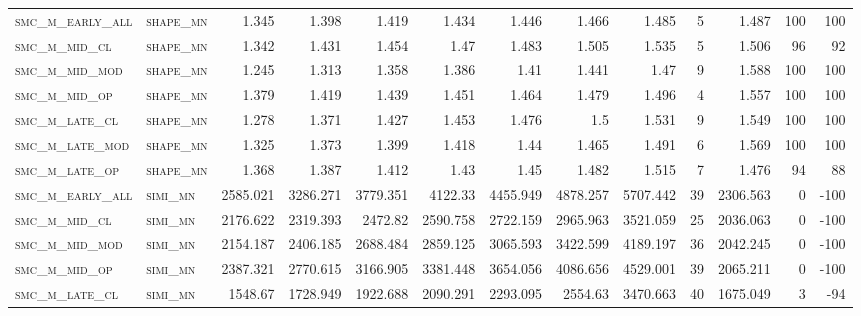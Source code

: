 \begin{landscape}
\begin{center}
\begin{footnotesize}
\begin{longtable}{llrrrrrrrr|rrr}
\textsc{smc\_m\_early\_all} & \textsc{shape\_mn }   & 1.345    & 1.398    & 1.419    & 1.434    & 1.446    & 1.466    & 1.485    & 5      & 1.487         & 100           & 100             \\
\textsc{smc\_m\_mid\_cl   } & \textsc{shape\_mn }   & 1.342    & 1.431    & 1.454    & 1.47     & 1.483    & 1.505    & 1.535    & 5      & 1.506         & 96            & 92              \\
\textsc{smc\_m\_mid\_mod  } & \textsc{shape\_mn }   & 1.245    & 1.313    & 1.358    & 1.386    & 1.41     & 1.441    & 1.47     & 9      & 1.588         & 100           & 100             \\
\textsc{smc\_m\_mid\_op   } & \textsc{shape\_mn }   & 1.379    & 1.419    & 1.439    & 1.451    & 1.464    & 1.479    & 1.496    & 4      & 1.557         & 100           & 100             \\
\textsc{smc\_m\_late\_cl  } & \textsc{shape\_mn }   & 1.278    & 1.371    & 1.427    & 1.453    & 1.476    & 1.5      & 1.531    & 9      & 1.549         & 100           & 100             \\
\textsc{smc\_m\_late\_mod } & \textsc{shape\_mn }   & 1.325    & 1.373    & 1.399    & 1.418    & 1.44     & 1.465    & 1.491    & 6      & 1.569         & 100           & 100             \\
\textsc{smc\_m\_late\_op  } & \textsc{shape\_mn }   & 1.368    & 1.387    & 1.412    & 1.43     & 1.45     & 1.482    & 1.515    & 7      & 1.476         & 94            & 88              \\
\textsc{smc\_m\_early\_all} & \textsc{simi\_mn  }   & 2585.021 & 3286.271 & 3779.351 & 4122.33  & 4455.949 & 4878.257 & 5707.442 & 39     & 2306.563      & 0             & -100            \\
\textsc{smc\_m\_mid\_cl   } & \textsc{simi\_mn  }   & 2176.622 & 2319.393 & 2472.82  & 2590.758 & 2722.159 & 2965.963 & 3521.059 & 25     & 2036.063      & 0             & -100            \\
\textsc{smc\_m\_mid\_mod  } & \textsc{simi\_mn  }   & 2154.187 & 2406.185 & 2688.484 & 2859.125 & 3065.593 & 3422.599 & 4189.197 & 36     & 2042.245      & 0             & -100            \\
\textsc{smc\_m\_mid\_op   } & \textsc{simi\_mn  }   & 2387.321 & 2770.615 & 3166.905 & 3381.448 & 3654.056 & 4086.656 & 4529.001 & 39     & 2065.211      & 0             & -100            \\
\textsc{smc\_m\_late\_cl  } & \textsc{simi\_mn  }   & 1548.67  & 1728.949 & 1922.688 & 2090.291 & 2293.095 & 2554.63  & 3470.663 & 40     & 1675.049      & 3             & -94             \\

\end{longtable}
\end{footnotesize}
\end{center}
\end{landscape}
